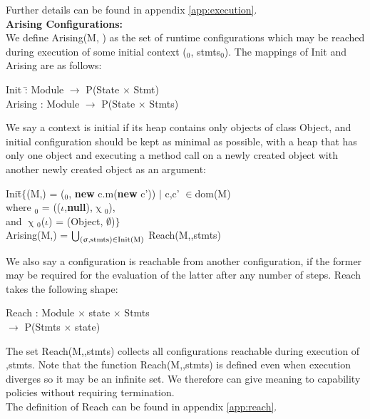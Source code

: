 \documentclass[a4paper,11pt,twoside]{article}
\newenvironment{logic}
{\begin{minipage}[c]{\linewidth}  \sffamily \mdseries \begin{tabbing}}
{\end{tabbing}\end{minipage}\vspace{0.3em}}
\newcommand{\loin}{$\in$}
\newcommand{\losigma}{\text{$\upsigma$}}
\newcommand{\lochi}{$\upchi$}
\newcommand{\ablock} {\null\qquad}
\begin{document}
Further details can be found in appendix \cref{app:execution}.\\

\textbf{Arising Configurations:}\\
We define Arising(M, \losigma) as the set of runtime configurations which may be reached during execution of some initial context (\losigma$_0$, stmts$_0$). The mappings of Init and Arising are as follows:\\

\begin{logic}
Init \ablock \=: Module $\rightarrow$ P(State $\times$ Stmt)\\
Arising \>: Module $\rightarrow$ P(State $\times$ Stmts)\\
\end{logic}

We say a context is initial if its heap contains only objects of class Object, and initial configuration should be kept as minimal as possible, with a heap that has only one object and executing a method call on a newly created object with another newly created object as an argument:\\

\begin{logic}
Init\=$\{$(M,\losigma) = (\losigma$_0$, \textbf{new} c.m(\textbf{new} c')) $|$ c,c' \loin dom(M)\\ \> where \losigma$_0$ = (($\iota$,\textbf{null}),\lochi$_0$),\\
\>and \lochi$_0$($\iota$) = (Object, $\emptyset$)$\}$\\
Arising(M,\losigma) = $\bigcup_{\text{(\losigma,stmts)\loin Init(M)}}$ Reach(M,\losigma,stmts)\\
\end{logic}

We also say a configuration is reachable from another configuration, if the former may be required for the evaluation of the latter after any number of steps. Reach takes the following shape:\\

\begin{logic}
Reach : Module $\times$ state $\times$ Stmts\\
\null\qquad $\rightarrow$ P(Stmts $\times$ state)\\
\end{logic}

The set Reach(M,\losigma,stmts) collects all configurations reachable during execution of \losigma,stmts. Note that the function Reach(M,\losigma,stmts) is defined even when execution diverges so it may be an infinite set. We therefore can give meaning to capability policies without requiring termination.\\
The definition of Reach can be found in appendix \cref{app:reach}.\\
\end{document}
